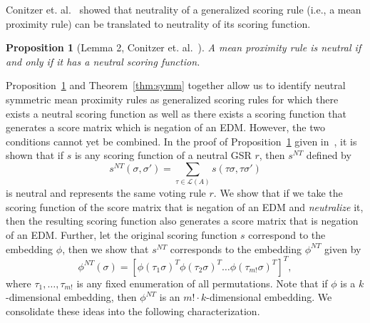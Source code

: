 \documentclass[10pt,letterpaper]{article}
\newcommand{\calL}{{\mathcal{L}}}
\newcommand{\rank}{{\calL(A)}}
\newtheorem{proposition}{Proposition}
\newcommand{\nt}{NT}
\begin{document}

Conitzer et. al.~\cite{CRX09} showed that neutrality of a generalized scoring rule (i.e., a mean proximity rule) can be translated to neutrality of its scoring function.
\begin{proposition}[Lemma 2, Conitzer et. al.~\cite{CRX09}]
A mean proximity rule is neutral if and only if it has a neutral scoring function.
\label{prop:gsr-neutral}
\end{proposition}


Proposition~\ref{prop:gsr-neutral} and Theorem~\ref{thm:symm} together allow us to identify neutral symmetric mean proximity rules as generalized scoring rules for which there exists a neutral scoring function as well as there exists a scoring function that generates a score matrix which is negation of an EDM. However, the two conditions cannot yet be combined. In the proof of Proposition~\ref{prop:gsr-neutral} given in~\cite{CRX09}, it is shown that if $s$ is any scoring function of a neutral GSR $r$, then $s^{\nt}$ defined by 
\begin{equation}
s^{\nt}(\sigma,\sigma') = \sum_{\tau \in \rank} s(\tau \sigma, \tau \sigma')
\label{eqn:s-nt}
\end{equation}
is neutral and represents the same voting rule $r$. We show that if we take the scoring function of the score matrix that is negation of an EDM and \emph{neutralize} it, then the resulting scoring function also generates a score matrix that is negation of an EDM. Further, let the original scoring function $s$ correspond to the embedding $\phi$, then we show that $s^{\nt}$ corresponds to the embedding $\phi^{\nt}$ given by 
\begin{equation}
\phi^{\nt}(\sigma) = [\phi(\tau_1 \sigma)^T \phi(\tau_2 \sigma)^T \ldots \phi(\tau_{m!} \sigma)^T]^T,
\label{eqn:phi-nt}
\end{equation}
where $\tau_1,\ldots,\tau_{m!}$ is any fixed enumeration of all permutations. Note that if $\phi$ is a $k$-dimensional embedding, then $\phi^{\nt}$ is an $m! \cdot k$-dimensional embedding. We consolidate these ideas into the following characterization.

\end{document}
